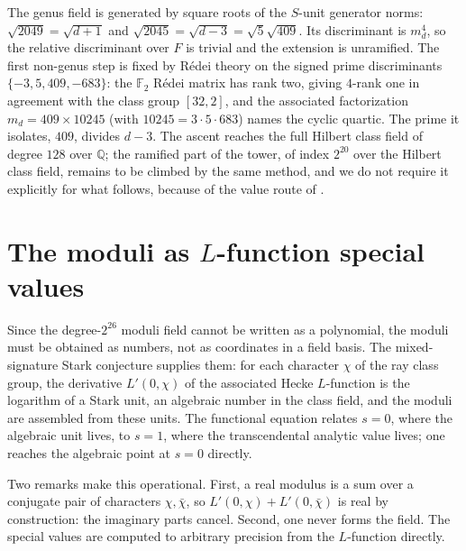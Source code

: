 \documentclass[12pt,a4paper]{article}
\newcommand{\Fd}{F}
\newcommand{\md}{m_d}
\begin{document}
The genus field is generated by square roots of the $S$-unit generator norms:
$\sqrt{2049} = \sqrt{d+1}$ and $\sqrt{2045}=\sqrt{d-3}=\sqrt{5}\sqrt{409}$. Its
discriminant is $\md^{4}$, so the relative discriminant over $\Fd$ is trivial and
the extension is unramified. The first non-genus step is fixed by R\'edei theory
on the signed prime discriminants $\{-3,5,409,-683\}$: the $\mathbb{F}_2$
R\'edei matrix has rank two, giving $4$-rank one in agreement with the class
group $[32,2]$, and the associated factorization $\md = 409\times 10245$ (with
$10245 = 3\cdot 5\cdot 683$) names the cyclic quartic. The prime it isolates,
$409$, divides $d-3$. The ascent reaches the full Hilbert class field of degree
$128$ over $\mathbb{Q}$; the ramified part of the tower, of index $2^{20}$ over
the Hilbert class field, remains to be climbed by the same method, and we do not
require it explicitly for what follows, because of the value route of
.

\section{The moduli as $L$-function special values}
\label{sec:portals}

Since the degree-$2^{26}$ moduli field cannot be written as a polynomial, the
moduli must be obtained as numbers, not as coordinates in a field basis. The
mixed-signature Stark conjecture supplies them: for each character $\chi$ of the
ray class group, the derivative $L'(0,\chi)$ of the associated Hecke
$L$-function is the logarithm of a Stark unit, an algebraic number in the class
field, and the moduli are assembled from these units. The functional equation
relates $s=0$, where the algebraic unit lives, to $s=1$, where the transcendental
analytic value lives; one reaches the algebraic point at $s=0$ directly.

Two remarks make this operational. First, a real modulus is a sum over a
conjugate pair of characters $\chi,\bar\chi$, so
$L'(0,\chi)+L'(0,\bar\chi)$ is real by construction: the imaginary parts cancel.
Second, one never forms the field. The special values are computed to arbitrary
precision from the $L$-function directly.
\end{document}
